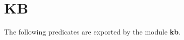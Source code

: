 %
% 
% 
% 
% 


\section{\eclipse KB}

The following predicates are exported by the module {\bf kb}.


